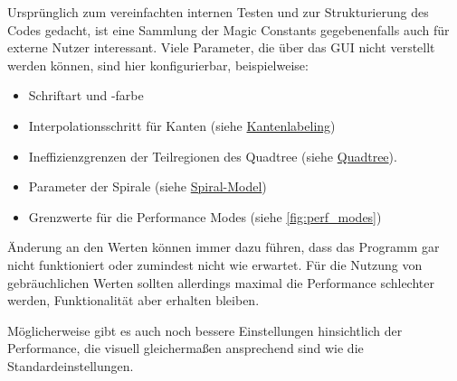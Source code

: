 
Ursprünglich zum vereinfachten internen Testen und zur Strukturierung des Codes gedacht, ist
eine Sammlung der Magic Constants gegebenenfalls auch für externe Nutzer interessant. Viele Parameter, die über das GUI
nicht verstellt werden können, sind hier konfigurierbar, beispielweise:
\begin{itemize}
    \item Schriftart und -farbe
    \item Interpolationsschritt für Kanten (siehe \hyperref[subsec:labeling_edges]{Kantenlabeling})
    \item Ineffizienzgrenzen der Teilregionen des Quadtree (siehe \hyperref[subsec:quadtree]{Quadtree}).
    \item Parameter der Spirale (siehe \hyperref[subsubsec:spiral]{Spiral-Model})
    \item Grenzwerte für die Performance Modes (siehe \autoref{fig:perf_modes})
\end{itemize}

Änderung an den Werten können immer dazu führen, dass das Programm gar nicht funktioniert oder zumindest nicht wie erwartet.
Für die Nutzung von gebräuchlichen Werten sollten allerdings maximal die Performance schlechter werden, Funktionalität aber erhalten bleiben.

Möglicherweise gibt es auch noch bessere Einstellungen hinsichtlich der Performance, die visuell gleichermaßen ansprechend sind wie die Standardeinstellungen.